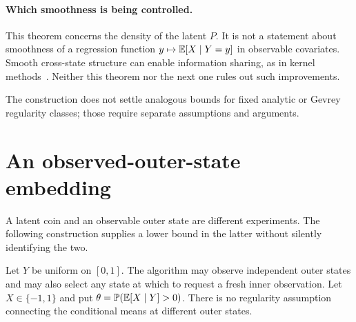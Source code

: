 \paragraph{Which smoothness is being controlled.}
This theorem concerns the density of the latent $P$. It is not a statement
about smoothness of a regression function $y\mapsto\mathbb E[X\mid Y=y]$ in
observable covariates. Smooth cross-state structure can enable information
sharing, as in kernel methods~\cite{chen}. Neither this theorem nor the
next one rules out such improvements.

The construction does not settle analogous bounds for fixed analytic or
Gevrey regularity classes; those require separate assumptions and arguments.

\section{An observed-outer-state embedding}\label{sec:outer}
A latent coin and an observable outer state are different experiments.
The following construction supplies a lower bound in the latter without
silently identifying the two.

Let $Y$ be uniform on $[0,1]$. The algorithm may observe independent outer
states and may also select any state at which to request a fresh inner
observation. Let $X\in\{-1,1\}$ and put
$\theta=\mathbb P(\mathbb E[X\mid Y]>0)$. There is no regularity assumption connecting
the conditional means at different outer states.

